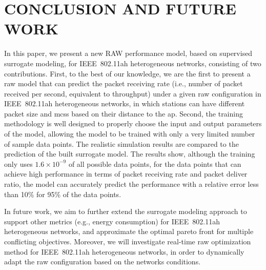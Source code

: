 \section{CONCLUSION AND FUTURE WORK \label{sec:conclusion}}

In this paper, we present a new RAW performance model, based on supervised surrogate modeling, for IEEE~802.11ah heterogeneous networks, consisting of
two contributions. First, to the best of our knowledge, we are the first to present a \gls{raw} model that can predict the packet receiving rate (i.e., number of packet received per second, equivalent to throughput) under a given \gls{raw} configuration in IEEE~802.11ah heterogeneous networks, in which stations can have different packet size and \gls{mcs}s based on their distance to the \gls{ap}. Second, the training methodology is well designed to properly choose the input and output parameters of the model, allowing the model to be trained with only a very limited number of sample data points. The realistic simulation results are compared to the prediction of the built surrogate model. The results show, although the training only uses $1.6 \times 10^{-9}$ of all possible data points, for the data points that can achieve high performance in terms of packet receiving rate and packet deliver ratio,  the model can accurately predict the performance with a relative error less than 10\% for 95\% of the data points. 

In future work, we aim to further extend the surrogate modeling approach to support other metrics (e.g., energy consumption) for IEEE~802.11ah heterogeneous networks, and approximate the optimal pareto front for multiple conflicting objectives. Moreover, we will investigate real-time \gls{raw} optimization method for IEEE~802.11ah heterogeneous networks, in order to dynamically adapt the \gls{raw} configuration based on the networks conditions.   





 




